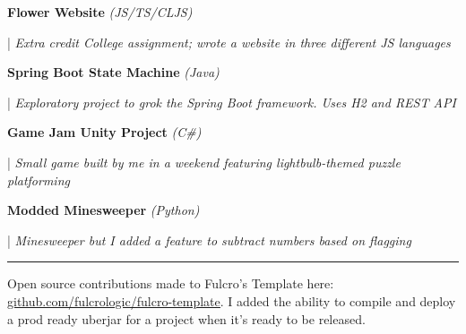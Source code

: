 \documentclass[letterpaper,11pt]{article}
\begin{document}
\begin{minipage}[t]{0.28\textwidth}
    \raggedright
    \textbf{ Flower Website }\textit{(JS/TS/CLJS)} \\
\end{minipage}
\hfill
\begin{minipage}[t]{0.70\textwidth}
    \raggedright
    |\textit{ Extra credit College assignment; wrote a website in three different JS languages } \\
\end{minipage}

\begin{minipage}[t]{0.28\textwidth}
    \raggedright
    \textbf{ Spring Boot State Machine }\textit{(Java)} \\
\end{minipage}
\hfill
\begin{minipage}[t]{0.70\textwidth}
    \raggedright
    |\textit{ Exploratory project to grok the Spring Boot framework. Uses H2 and REST API} \\
\end{minipage}

\begin{minipage}[t]{0.28\textwidth}
    \raggedright
    \textbf{ Game Jam Unity Project }\textit{(C\#)} \\
\end{minipage}
\hfill
\begin{minipage}[t]{0.70\textwidth}
    \raggedright
    |\textit{ Small game built by me in a weekend featuring lightbulb-themed puzzle platforming} \\
\end{minipage}

\begin{minipage}[t]{0.28\textwidth}
    \raggedright
    \textbf{ Modded Minesweeper }\textit{(Python)} \\
\end{minipage}
\hfill
\begin{minipage}[t]{0.70\textwidth}
    \raggedright
    |\textit{ Minesweeper but I added a feature to subtract numbers based on flagging} \\
\end{minipage}

\noindent\rule{19.5cm}{0.4pt}

Open source contributions made to Fulcro’s Template here:
\href{https://github.com/fulcrologic/fulcro-template}{\underline{github.com/fulcrologic/fulcro-template}}. I added the ability to compile and deploy a prod ready uberjar for a project when it's ready to be released.


\end{document}
